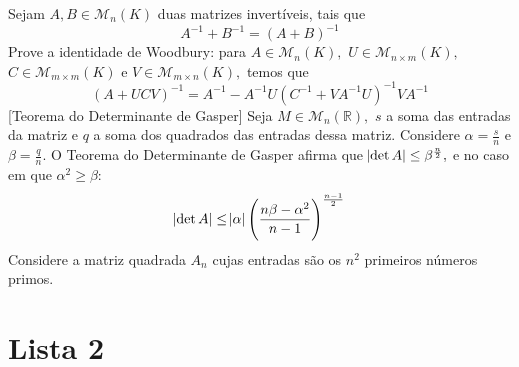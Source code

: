 \documentclass[11pt,a4paper]{article}
\begin{document}
 Sejam $A, B \in \mathcal{M}_n(K)$ duas matrizes invertíveis, tais que
\[
A^{-1} + B^{-1} = (A + B)^{-1}
\]
    \solucao{}
     Prove a identidade de Woodbury: para $A \in \mathcal{M}_n(K),$ $U \in \mathcal{M}_{n \times m}(K),$ $C \in \mathcal{M}_{m \times m}(K)$ e $V \in \mathcal{M}_{m \times n}(K),$ temos que
    \[\left(A + UCV \right)^{-1} = A^{-1} - A^{-1}U \left(C^{-1} + VA^{-1}U \right)^{-1} VA^{-1}
    \]
    \solucao{}
     [Teorema do Determinante de Gasper] 
    Seja $M \in \mathcal{M}_n(\mathbb{R}),$ $s$ a soma das entradas da matriz e $q$ a soma dos quadrados das entradas dessa matriz. Considere $\alpha = \frac{s}{n}$ e $\beta = \frac{q}{n}.$ O Teorema do Determinante de Gasper afirma que $\abs{\det A} \le \beta^{\frac{n}{2}},$ e no caso em que $\alpha^2 \ge \beta:$
    \[
    \abs{\det A} \le \abs{\alpha} \left(  \frac{n \beta - \alpha^2 }{n-1} \right)^{\frac{n-1}{2}}
    \]
        \solucao{}
     Considere a matriz quadrada $A_n$ cujas entradas são os $n^2$ primeiros números primos. 
    

\newpage
\section{\textcolor{Floresta}{Lista 2}}
\end{document}
